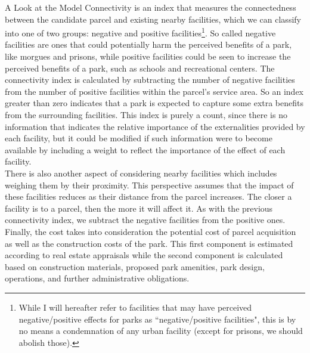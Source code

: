 \documentclass[12pt]{pom_thesis}
\theoremstyle{definition}
\begin{document}
\begin{chapter}{A Look at the Model}
	Connectivity is an index that measures the connectedness between the candidate parcel and existing nearby facilities, which we can classify into one of two groups: negative and positive facilities\footnote{While I will hereafter refer to facilities that may have perceived negative/positive effects for parks as ``negative/positive facilities", this is by no means a condemnation of any urban facility (except for prisons, we should abolish those).}. So called negative facilities  are ones that could potentially harm the perceived benefits of a park, like morgues and prisons, while positive facilities could be seen to increase the perceived benefits of a park, such as schools and recreational centers. The connectivity index is calculated by subtracting the number of negative facilities from the number of positive facilities within the parcel's service area. So an index greater than zero indicates that a park is expected to capture some extra benefits from the surrounding facilities. This index is purely a count, since there is no information that indicates the relative importance of the externalities provided by each facility, but it could be modified if such information were to become available by including a weight to reflect the importance of the effect of each facility. \\

There is also another aspect of considering nearby facilities which includes weighing them by their proximity. This perspective assumes that the impact of these facilities reduces as their distance from the parcel increases. The closer a facility is to a parcel, then the more it will affect it. As with the previous connectivity index, we subtract the negative facilities from the positive ones. Finally, the cost takes into consideration the potential cost of parcel acquisition as well as the construction costs of the park. This first component is estimated according to real estate appraisals while the second component is calculated based on construction materials, proposed park amenities, park design, operations, and further administrative obligations. \\


\end{chapter}
\end{document}
